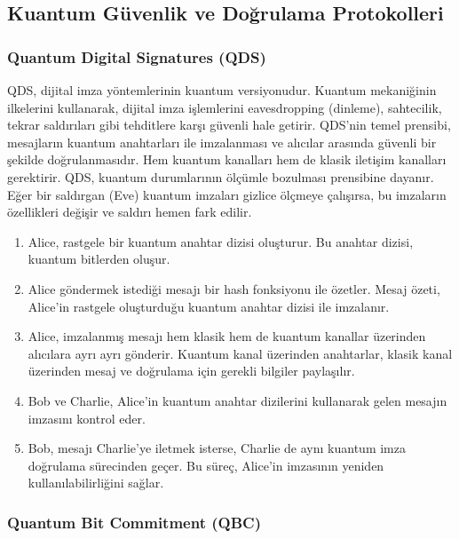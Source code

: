 \newpage

\subsection{Kuantum Güvenlik ve Doğrulama Protokolleri}

\subsubsection{Quantum Digital Signatures (QDS)}

QDS, dijital imza yöntemlerinin kuantum versiyonudur. Kuantum mekaniğinin ilkelerini kullanarak, dijital imza işlemlerini eavesdropping (dinleme), sahtecilik, tekrar saldırıları gibi tehditlere karşı güvenli hale getirir. QDS'nin temel prensibi, mesajların kuantum anahtarları ile imzalanması ve alıcılar arasında güvenli bir şekilde doğrulanmasıdır. Hem kuantum kanalları hem de klasik iletişim kanalları gerektirir. QDS, kuantum durumlarının ölçümle bozulması prensibine dayanır. Eğer bir saldırgan (Eve) kuantum imzaları gizlice ölçmeye çalışırsa, bu imzaların özellikleri değişir ve saldırı hemen fark edilir.

\begin{enumerate}
    \item Alice, rastgele bir kuantum anahtar dizisi oluşturur. Bu anahtar dizisi, kuantum bitlerden oluşur.
    \item Alice göndermek istediği mesajı bir hash fonksiyonu ile özetler.  Mesaj özeti, Alice'in rastgele oluşturduğu kuantum anahtar dizisi ile imzalanır. 
    \item Alice, imzalanmış mesajı hem klasik hem de kuantum kanallar üzerinden alıcılara ayrı ayrı gönderir. Kuantum kanal üzerinden anahtarlar, klasik kanal üzerinden mesaj ve doğrulama için gerekli bilgiler paylaşılır.
    \item Bob ve Charlie, Alice'in kuantum anahtar dizilerini kullanarak gelen mesajın imzasını kontrol eder. 
    \item  Bob, mesajı Charlie'ye iletmek isterse, Charlie de aynı kuantum imza doğrulama sürecinden geçer. Bu süreç, Alice'in imzasının yeniden kullanılabilirliğini sağlar.
\end{enumerate}

\newpage

\subsubsection{Quantum Bit Commitment (QBC)}

